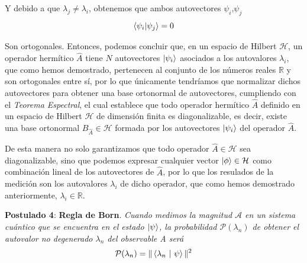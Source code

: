 \documentclass{article}
\numberwithin{equation}{section} %
\begin{document}
    \vspace{1.5mm}

    Y debido a que \( \lambda_{j} \neq \lambda_{i} \), obtenemos que ambos autovectores \( \psi_{i} \text{,} \psi_{j} \)
    \begin{equation}
        \braket{\psi_{i} | \psi_{j}} = 0
    \end{equation}

    \vspace{1.5mm}

    Son ortogonales. Entonces, podemos concluir que, en un espacio de Hilbert \( \mathcal{H} \), un operador hermítico \( \hat{A} \) tiene \( N \) autovectores \( \ket{\psi_{i}} \) asociados a los autovalores \( \lambda_{i} \), que como hemos demostrado, pertenecen al conjunto de los números reales \( \mathbb{R} \) y son ortogonales entre sí, por lo que únicamente tendríamos que normalizar dichos autovectores para obtener una base ortonormal de autovectores, cumpliendo con el \textit{Teorema Espectral}, el cual establece que todo operador hermítico \( \hat{A} \) definido en un espacio de Hilbert \( \mathcal{H} \) de dimensión finita es diagonalizable, es decir, existe una base ortonormal \( B_{\hat{A}} \in \mathcal{H} \) formada por los autovectores \( \ket{\psi_{i}} \) del operador \( \hat{A} \).

    \vspace{5mm}
    
    De esta manera no solo garantizamos que todo operador \( \hat{A} \in \mathcal{H} \) sea diagonalizable, sino que podemos expresar cualquier vector \( \ket{\phi} \in \mathcal{H} \) como combinación lineal de los autovectores de \( \hat{A} \), por lo que los resulados de la medición son los autovalores \( \lambda_{i} \) de dicho operador, que como hemos demostrado anteriormente, \( \lambda_{i} \in \mathbb{R} \).

    \vspace{10mm}

    \textbf{Postulado 4}: \textbf{Regla de Born}. \textit{Cuando medimos la magnitud \( \mathcal{A} \) en un sistema
    cuántico que se encuentra en el estado \( \ket{\psi} \), la probabilidad \( \mathcal{P}(\lambda_{n})\) de obtener el
    autovalor no degenerado \( \lambda_{n}\) del observable A será}
    \begin{equation}
        \mathcal{P}(\lambda_{n}) = \| \braket{\lambda_{n} \ | \ \psi} \| ^{2}
        \label{eq: regla_born}
    \end{equation}
\end{document}
